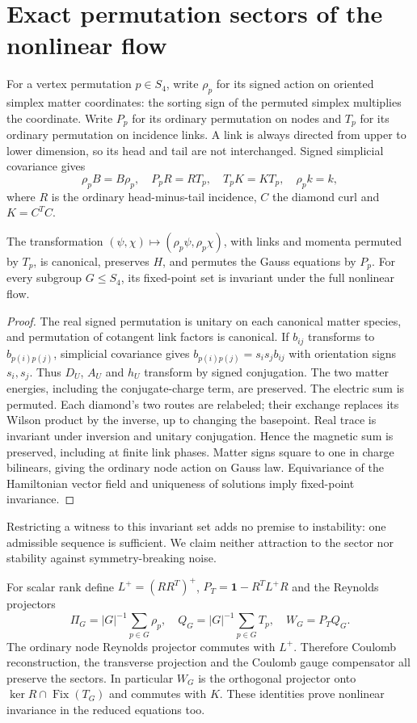\documentclass[11pt,a4paper]{article}
\newcommand{\id}{\mathbf1}\newcommand{\tr}{\operatorname{tr}}\newcommand{\diag}{\operatorname{diag}}\newcommand{\Fix}{\operatorname{Fix}}\newcommand{\Rea}{\operatorname{Re}}
\begin{document}
\newpage
\section{Exact permutation sectors of the nonlinear flow}
For a vertex permutation $p\in S_4$, write $\rho_p$ for its signed action on oriented simplex matter coordinates: the sorting sign of the permuted simplex multiplies the coordinate. Write $P_p$ for its ordinary permutation on nodes and $T_p$ for its ordinary permutation on incidence links. A link is always directed from upper to lower dimension, so its head and tail are not interchanged. Signed simplicial covariance gives
\[
\rho_p B=B\rho_p,\quad P_p R=RT_p,\quad T_p K=KT_p,
\quad \rho_p k=k,
\]
where $R$ is the ordinary head-minus-tail incidence, $C$ the diamond curl and $K=C^TC$.

\begin{lemma}\label{lem:equiv}
The transformation $(\psi,\chi)\mapsto(\rho_p\psi,\rho_p\chi)$, with links and momenta permuted by $T_p$, is canonical, preserves $H$, and permutes the Gauss equations by $P_p$. For every subgroup $G\leq S_4$, its fixed-point set is invariant under the full nonlinear flow.
\end{lemma}
\begin{proof}
The real signed permutation is unitary on each canonical matter species, and permutation of cotangent link factors is canonical. If $b_{ij}$ transforms to $b_{p(i)p(j)}$, simplicial covariance gives $b_{p(i)p(j)}=s_i s_j b_{ij}$ with orientation signs $s_i,s_j$. Thus $D_U$, $A_U$ and $h_U$ transform by signed conjugation. The two matter energies, including the conjugate-charge term, are preserved. The electric sum is permuted. Each diamond's two routes are relabeled; their exchange replaces its Wilson product by the inverse, up to changing the basepoint. Real trace is invariant under inversion and unitary conjugation. Hence the magnetic sum is preserved, including at finite link phases. Matter signs square to one in charge bilinears, giving the ordinary node action on Gauss law. Equivariance of the Hamiltonian vector field and uniqueness of solutions imply fixed-point invariance.
\end{proof}
Restricting a witness to this invariant set adds no premise to instability: one admissible sequence is sufficient. We claim neither attraction to the sector nor stability against symmetry-breaking noise.

For scalar rank define $L^+=(RR^T)^+$, $P_T=\id-R^TL^+R$ and the Reynolds projectors
\[
\Pi_G=|G|^{-1}\sum_{p\in G}\rho_p,\quad
Q_G=|G|^{-1}\sum_{p\in G}T_p,\quad W_G=P_TQ_G.
\]
The ordinary node Reynolds projector commutes with $L^+$. Therefore Coulomb reconstruction, the transverse projection and the Coulomb gauge compensator all preserve the sectors. In particular $W_G$ is the orthogonal projector onto $\ker R\cap\Fix(T_G)$ and commutes with $K$. These identities prove nonlinear invariance in the reduced equations too.
\end{document}
